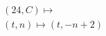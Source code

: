 \documentclass[preview]{standalone}
\begin{document}
\begin{align*}
&(24,C) \mapsto \\& (t,n) \mapsto (t, -n + 2)
\end{align*}
\end{document}
